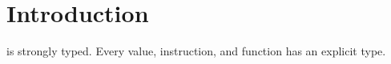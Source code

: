 \section{Introduction}

  is strongly typed. Every value, instruction, and function has an explicit type.

